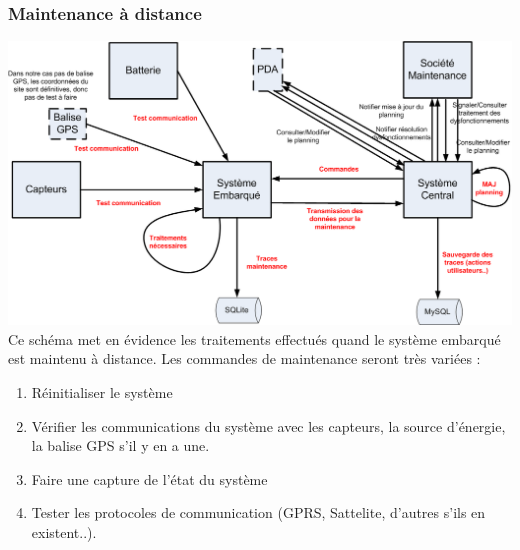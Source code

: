             \subsubsection{Maintenance à distance}
            \includegraphics[width = \textwidth] {./img/MaintenanceDistante.png}
Ce schéma met en évidence les traitements effectués quand le système embarqué est maintenu à distance. Les commandes de maintenance seront 
très variées :
\begin{enumerate}
       \item Réinitialiser le système
       \item Vérifier les communications du système avec les capteurs, la source d'énergie, la balise GPS s'il y en a une.
       \item Faire une capture de l'état du système
       \item Tester les protocoles de communication (GPRS, Sattelite, d'autres s'ils en existent..).
 \end{enumerate}
